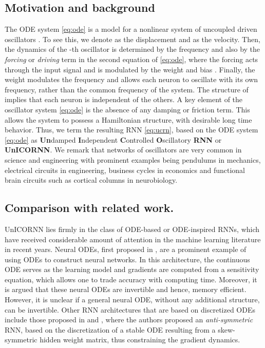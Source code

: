 \documentclass[a4paper]{article}
\begin{document}
\subsection{Motivation and background}
The ODE system \eqref{eq:ode} is a model for a nonlinear system of uncoupled driven oscillators \cite{GHbook}. To see this, we denote  as the displacement and  as the velocity. Then, the dynamics of the -th oscillator is determined by the frequency  and also by the \emph{forcing} or \emph{driving} term in the second equation of \eqref{eq:ode}, where the forcing acts through the input signal  and is modulated by the weight  and bias . Finally, the weight  modulates the frequency  and allows each neuron to oscillate with its own frequency, rather than the common frequency  of the system. The structure of  implies that each neuron is independent of the others. A key element of the oscillator system \eqref{eq:ode} is the absence of any damping or friction term. This allows the system to possess a Hamiltonian structure, with desirable long time behavior. Thus, we term the resulting RNN \eqref{eq:ucrn}, based on the ODE system \eqref{eq:ode} as \textbf{Un}damped \textbf{I}ndependent \textbf{C}ontrolled \textbf{O}scillatory \textbf{RNN} or \textbf{UnICORNN}. We remark that networks of oscillators are very common in science and engineering \cite{GHbook,stgz2} with prominent examples being pendulums in mechanics, electrical circuits in engineering, business cycles in economics and functional brain circuits such as cortical columns in neurobiology. 
\subsection{Comparison with related work.}
UnICORNN lies firmly in the class of ODE-based or ODE-inspired RNNs, which have received considerable amount of attention in the machine learning literature in recent years. Neural ODEs, first proposed in \cite{neuralODE}, are a prominent example of using ODEs to construct neural networks. In this architecture, the continuous ODE serves as the learning model and gradients are computed from a sensitivity equation, which allows one to trade accuracy with computing time. Moreover, it is argued that these neural ODEs are invertible and hence, memory efficient. However, it is unclear if a general neural ODE, without any additional structure, can be invertible. Other RNN architectures that are based on discretized ODEs include those proposed in \cite{E} and \cite{anti}, where the authors proposed an \emph{anti-symmetric} RNN, based on the discretization of a stable ODE resulting from a skew-symmetric hidden weight matrix, thus constraining the gradient dynamics.
\end{document}
